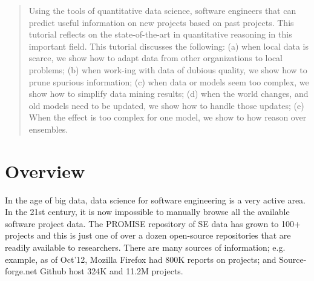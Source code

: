 \documentclass[conference]{IEEEtran}
\begin{document}
\begin{abstract}
Using the tools of quantitative data science, software engineers that can predict useful information on new projects based on past projects.  This tutorial reflects on the state-of-the-art in quantitative  reasoning in this important field. This  tutorial discusses the following:   (a) when local data is scarce, we show how to adapt data from other organizations to local problems; (b) when work-ing with data of dubious quality, we show how to prune spurious information; (c) when data or models seem too complex, we show how to simplify   data mining results; (d) when the world changes, and old models need to be updated, we show how to handle those updates; (e) When the effect is too complex for one model, we show to how reason over ensembles.
\end{abstract}





%
\IEEEpeerreviewmaketitle
 
 \section{Overview}
 In the age of big data, data science for software engineering is a very active area.  In the 21st century, it is now impossible to manually browse all the available software project data. The PROMISE repository of SE data has grown to 100+ projects and this is just one of over a dozen open-source repositories that are readily available to researchers. There are many sources of information; e.g. example, as of Oct’12, Mozilla Firefox had 800K reports on projects; and Source-forge.net Github host 324K and 11.2M projects.
\end{document}
